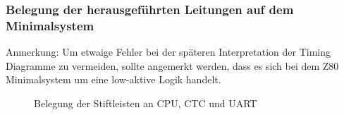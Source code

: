 \subsubsection{Belegung der herausgeführten Leitungen auf dem Minimalsystem}
\begin{warning}
Anmerkung: Um etwaige Fehler bei der späteren Interpretation der Timing Diagramme zu vermeiden, sollte angemerkt werden, dass es sich bei dem Z80 Minimalsystem um eine low-aktive Logik handelt.
\end{warning}
\begin{figure}[htb]
    \centering
    \qquad
    \qquad
    \qquad
    \caption[Z80 Belegung der Stiftleisten an CPU, CTC und UART]{Belegung der Stiftleisten an CPU, CTC und UART}
    \label{fig:z80-stiftleiste}
\end{figure}

